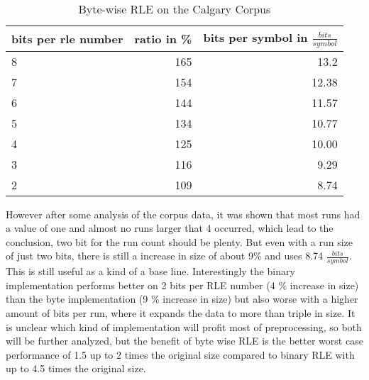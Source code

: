 \begin{table}[h]
	\centering
	\begin{tabular}{l|r|r}
		\label{tab:t5 run length eval}
		
		bits per rle number &  ratio in \% & bits per symbol in $\frac{bits}{symbol}$\\
		\hline
		8 & 165 & 13.2 \\
		7 & 154 & 12.38\\
		6 & 144 & 11.57 \\
		5 & 134 & 10.77\\
		4 & 125 & 10.00\\
		3 & 116 & 9.29\\
		2 & 109 & 8.74 \\
	\end{tabular}
	\caption{Byte-wise RLE on the Calgary Corpus}
\end{table}


\par{
 However after some analysis of the corpus data, it was shown that most runs had a value of one and almost no runs larger that 4 occurred, which lead to the conclusion, two bit for the run count should be plenty. But even with a run size of just two bits, there is still a increase in size of about 9\% and uses 8.74 $\frac{bits}{symbol}$. This is still useful as a kind of a base line. Interestingly the binary implementation performs better on 2 bits per RLE number (4 \% increase in size) than the byte implementation (9 \% increase in size) but also worse with a higher amount of bits per run, where it expands the data to more than triple in size. It is unclear which kind of implementation will profit most of preprocessing, so both will be further analyzed, but the benefit of byte wise RLE is the better worst case performance of 1.5 up to 2 times the original size compared to binary RLE with up to 4.5 times the original size.
}

